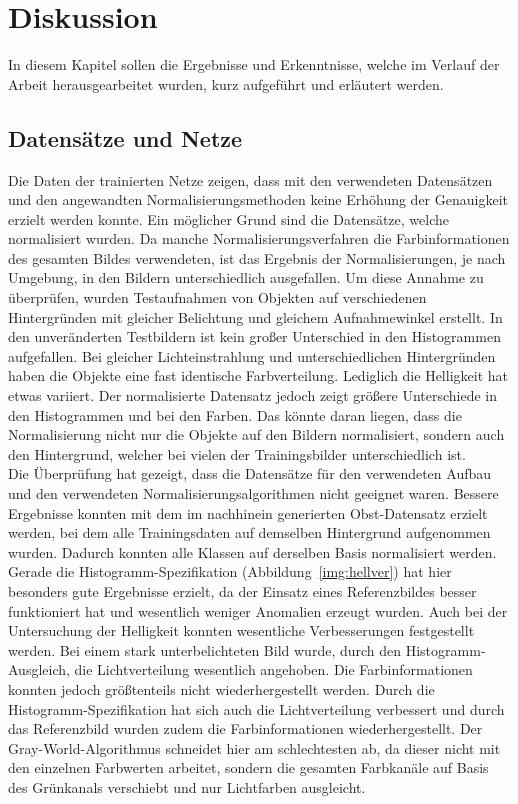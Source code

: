 \chapter{Diskussion}\label{s.diskussion}
In diesem Kapitel sollen die Ergebnisse und Erkenntnisse, welche im Verlauf der Arbeit herausgearbeitet wurden, kurz aufgeführt und erläutert werden.
\section{Datensätze und Netze}
Die Daten der trainierten Netze zeigen, dass mit den verwendeten Datensätzen und den angewandten Normalisierungsmethoden keine Erhöhung der Genauigkeit erzielt werden konnte. Ein möglicher Grund sind die Datensätze, welche normalisiert wurden. Da manche Normalisierungsverfahren die Farbinformationen des gesamten Bildes verwendeten, ist das Ergebnis der Normalisierungen, je nach Umgebung, in den Bildern unterschiedlich ausgefallen. Um diese Annahme zu überprüfen, wurden Testaufnahmen von Objekten auf verschiedenen Hintergründen mit gleicher Belichtung und gleichem Aufnahmewinkel erstellt. In den unveränderten Testbildern ist kein großer Unterschied in den Histogrammen aufgefallen. Bei gleicher Lichteinstrahlung und unterschiedlichen Hintergründen haben die Objekte eine fast identische Farbverteilung. Lediglich die Helligkeit hat etwas variiert. Der normalisierte Datensatz jedoch zeigt größere Unterschiede in den Histogrammen und bei den Farben. Das könnte daran liegen, dass die Normalisierung nicht nur die Objekte auf den Bildern normalisiert, sondern auch den Hintergrund, welcher bei vielen der Trainingsbilder unterschiedlich ist.\\ 
Die Überprüfung hat gezeigt, dass die Datensätze für den verwendeten Aufbau und den verwendeten Normalisierungsalgorithmen nicht geeignet waren. Bessere Ergebnisse konnten mit dem im nachhinein generierten Obst-Datensatz erzielt werden, bei dem alle Trainingsdaten auf demselben Hintergrund aufgenommen wurden. Dadurch konnten alle Klassen auf derselben Basis normalisiert werden. Gerade die Histogramm-Spezifikation (Abbildung~\ref{img:hellver}) hat hier besonders gute Ergebnisse erzielt, da der Einsatz eines Referenzbildes besser funktioniert hat und wesentlich weniger Anomalien erzeugt wurden. Auch bei der Untersuchung der Helligkeit konnten wesentliche Verbesserungen festgestellt werden. Bei einem stark unterbelichteten Bild wurde, durch den Histogramm-Ausgleich, die Lichtverteilung wesentlich angehoben. Die Farbinformationen konnten jedoch größtenteils nicht wiederhergestellt werden. Durch die Histogramm-Spezifikation hat sich auch die Lichtverteilung verbessert und durch das Referenzbild wurden zudem die Farbinformationen wiederhergestellt. Der Gray-World-Algorithmus schneidet hier am schlechtesten ab, da dieser nicht mit den einzelnen Farbwerten arbeitet, sondern die gesamten Farbkanäle auf Basis des Grünkanals verschiebt und nur Lichtfarben ausgleicht. 
